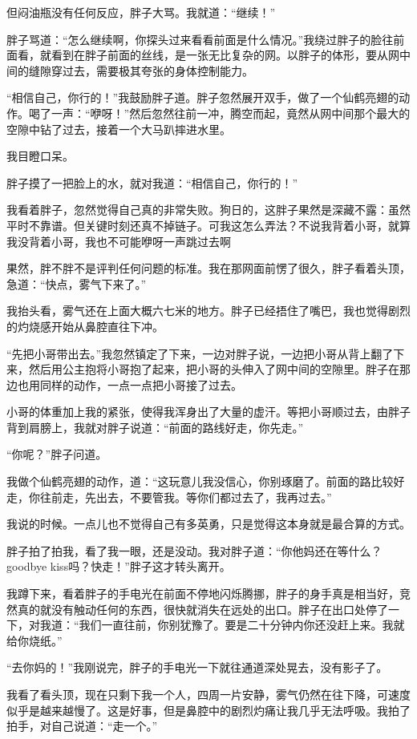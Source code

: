 但闷油瓶没有任何反应，胖子大骂。我就道：“继续！”

胖子骂道：“怎么继续啊，你探头过来看看前面是什么情况。”我绕过胖子的脸往前面看，就看到在胖子前面的丝线，是一张无比复杂的网。以胖子的体形，要从网中间的缝隙穿过去，需要极其夸张的身体控制能力。

“相信自己，你行的！”我鼓励胖子道。胖子忽然展开双手，做了一个仙鹤亮翅的动作。喝了一声：“咿呀！”然后忽然往前一冲，腾空而起，竟然从网中间那个最大的空隙中钻了过去，接着一个大马趴摔进水里。

我目瞪口呆。

胖子摸了一把脸上的水，就对我道：“相信自己，你行的！”

我看着胖子，忽然觉得自己真的非常失败。狗日的，这胖子果然是深藏不露：虽然平时不靠谱。但关键时刻还真不掉链子。可我这怎么弄法？不说我背着小哥，就算我没背着小哥，我也不可能咿呀一声跳过去啊

果然，胖不胖不是评判任何问题的标准。我在那网面前愣了很久，胖子看着头顶，急道：“快点，雾气下来了。”

我抬头看，雾气还在上面大概六七米的地方。胖子已经捂住了嘴巴，我也觉得剧烈的灼烧感开始从鼻腔直往下冲。

“先把小哥带出去。”我忽然镇定了下来，一边对胖子说，一边把小哥从背上翻了下来，然后用公主抱将小哥抱了起来，把小哥的头伸入了网中间的空隙里。胖子在那边也用同样的动作，一点一点把小哥接了过去。

小哥的体重加上我的紧张，使得我浑身出了大量的虚汗。等把小哥顺过去，由胖子背到肩膀上，我就对胖子说道：“前面的路线好走，你先走。”

“你呢？”胖子问道。

我做个仙鹤亮翅的动作，道：“这玩意儿我没信心，你别琢磨了。前面的路比较好走，你往前走，先出去，不要管我。等你们都过去了，我再过去。”

我说的时候。一点儿也不觉得自己有多英勇，只是觉得这本身就是最合算的方式。

胖子拍了拍我，看了我一眼，还是没动。我对胖子道：“你他妈还在等什么？goodbye kiss吗？快走！”胖子这才转头离开。

我蹲下来，看着胖子的手电光在前面不停地闪烁腾挪，胖子的身手真是相当好，竞然真的就没有触动任何的东西，很快就消失在远处的出口。胖子在出口处停了一下，对我道：“我们一直往前，你别犹豫了。要是二十分钟内你还没赶上来。我就给你烧纸。”

“去你妈的！”我刚说完，胖子的手电光一下就往通道深处晃去，没有影子了。

我看了看头顶，现在只剩下我一个人，四周一片安静，雾气仍然在往下降，可速度似乎是越来越慢了。这是好事，但是鼻腔中的剧烈灼痛让我几乎无法呼吸。我拍了拍手，对自己说道：“走一个。”

